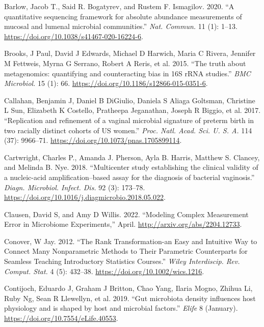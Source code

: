 \documentclass[
]{article}
\newlength{\cslhangindent}
\newlength{\cslentryspacingunit} %
\newenvironment{CSLReferences}[2] %
 {%
  \setlength{\parindent}{0pt}
  \ifodd #1
  \let\oldpar\par
  \def\par{\hangindent=\cslhangindent\oldpar}
  \fi
  \setlength{\parskip}{#2\cslentryspacingunit}
 }%
 {}
\begin{document}
\hypertarget{refs}{}
\begin{CSLReferences}{1}{0}
\leavevmode{}%
Barlow, Jacob T., Said R. Bogatyrev, and Rustem F. Ismagilov. 2020. {``{A quantitative sequencing framework for absolute abundance measurements of mucosal and lumenal microbial communities}.''} \emph{Nat. Commun.} 11 (1): 1--13. \url{https://doi.org/10.1038/s41467-020-16224-6}.

\leavevmode{}%
Brooks, J Paul, David J Edwards, Michael D Harwich, Maria C Rivera, Jennifer M Fettweis, Myrna G Serrano, Robert A Reris, et al. 2015. {``{The truth about metagenomics: quantifying and counteracting bias in 16S rRNA studies}.''} \emph{BMC Microbiol.} 15 (1): 66. \url{https://doi.org/10.1186/s12866-015-0351-6}.

\leavevmode{}%
Callahan, Benjamin J, Daniel B DiGiulio, Daniela S Aliaga Goltsman, Christine L Sun, Elizabeth K Costello, Pratheepa Jeganathan, Joseph R Biggio, et al. 2017. {``{Replication and refinement of a vaginal microbial signature of preterm birth in two racially distinct cohorts of US women}.''} \emph{Proc. Natl. Acad. Sci. U. S. A.} 114 (37): 9966--71. \url{https://doi.org/10.1073/pnas.1705899114}.

\leavevmode{}%
Cartwright, Charles P., Amanda J. Pherson, Ayla B. Harris, Matthew S. Clancey, and Melinda B. Nye. 2018. {``{Multicenter study establishing the clinical validity of a nucleic-acid amplification--based assay for the diagnosis of bacterial vaginosis}.''} \emph{Diagn. Microbiol. Infect. Dis.} 92 (3): 173--78. \url{https://doi.org/10.1016/j.diagmicrobio.2018.05.022}.

\leavevmode{}%
Clausen, David S, and Amy D Willis. 2022. {``Modeling Complex Measurement Error in Microbiome Experiments,''} April. \url{http://arxiv.org/abs/2204.12733}.

\leavevmode{}%
Conover, W Jay. 2012. {``The Rank Transformation-an Easy and Intuitive Way to Connect Many Nonparametric Methods to Their Parametric Counterparts for Seamless Teaching Introductory Statistics Courses.''} \emph{Wiley Interdiscip. Rev. Comput. Stat.} 4 (5): 432--38. \url{https://doi.org/10.1002/wics.1216}.

\leavevmode{}%
Contijoch, Eduardo J, Graham J Britton, Chao Yang, Ilaria Mogno, Zhihua Li, Ruby Ng, Sean R Llewellyn, et al. 2019. {``{Gut microbiota density influences host physiology and is shaped by host and microbial factors}.''} \emph{Elife} 8 (January). \url{https://doi.org/10.7554/eLife.40553}.


\end{CSLReferences}
\end{document}
